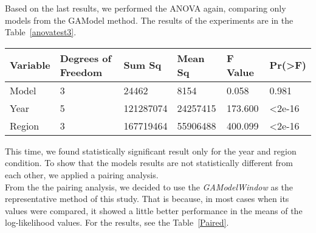 Based on the last results, we performed the ANOVA again, comparing only models from the GAModel method. The results of the experiments are in the Table~\ref{anovatest3}.\\

\begin{table*}[!ht]
	\centering
	\begin{tabular}{|l|l|l|l|l|l|}
		\hline
		{Variable} & {Degrees of Freedom} & {Sum Sq}    & {Mean Sq}   & {F Value} & {Pr(\textgreater F)} \\
		\hline
		Model    & 3            	  & 24462      & 8154       & 0.058      &  0.981      \\
		\hline
		Year     & 5                  & 121287074  & 24257415   & 173.600    & \textless2e-16     \\
		\hline
		Region   & 3                  & 167719464  & 55906488   & 400.099    & \textless2e-16	\\    
		\hline
	\end{tabular}
	\caption{Simple ANOVA Test Results.}
	\label{anovatest3}
\end{table*}

This time, we found statistically significant result only for the year and region condition. To show that the models results are not statistically different from each other, we applied a pairing analysis.\\

From the the pairing analysis, we decided to use the \textit{GAModelWindow} as the representative method of this study. That is because, in most cases when its values were compared, it showed a little better performance in the means of the log-likelihood values. For the results, see the Table~\ref{Paired}.\\

